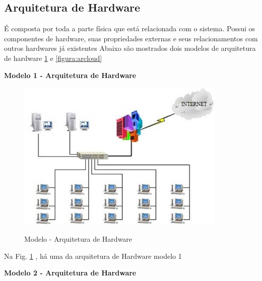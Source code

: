                 
                  \subsection{Arquitetura de Hardware}
  
 
É composta por toda a parte física que está relacionada com o sistema. Possui os componentes de hardware, suas propriedades externas e seus relacionamentos com outros hardwares já existentes
Abaixo são mostrados dois modelos de arquitetura de hardware   \ref{figura:arquiteturaDeHardware} e \ref{figura:arcloud}
  
   \textbf{Modelo 1 - Arquitetura de Hardware }
  
       \begin{figure}[H]
                 \caption{Modelo - Arquitetura de Hardware}
               \centering %
                \includegraphics[width=10cm]{analisedeProjeto/arquiteturaDeHardware} %
                \label{figura:arquiteturaDeHardware}
                \end{figure}
                Na Fig. \ref{figura:arquiteturaDeHardware} , há uma da arquitetura de Hardware modelo 1
                
                
                     \textbf{Modelo 2 - Arquitetura de Hardware }  
                
